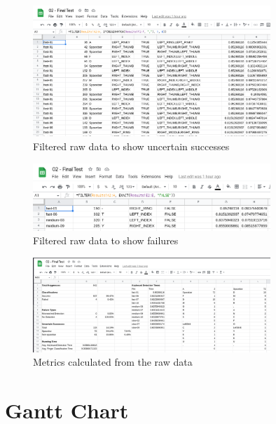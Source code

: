 \documentclass{report}
\begin{document}
\begin{figure}[H]
	\centering
	\includegraphics[width=0.8\textwidth]{sheets-uncertain.png}
	\caption{Filtered raw data to show uncertain successes}
\end{figure}

\begin{figure}[H]
	\centering
	\includegraphics[width=0.8\textwidth]{sheets-failures.png}
	\caption{Filtered raw data to show failures}
\end{figure}

\begin{figure}[H]
	\centering
	\includegraphics[width=0.8\textwidth]{sheets-analysis.png}
	\caption{Metrics calculated from the raw data}
\end{figure}

\chapter{Gantt Chart}
\begin{landscape}
	
\end{landscape}

\newpage
\printbibliography[heading=bibintoc,title={References}]{}
\end{document}
